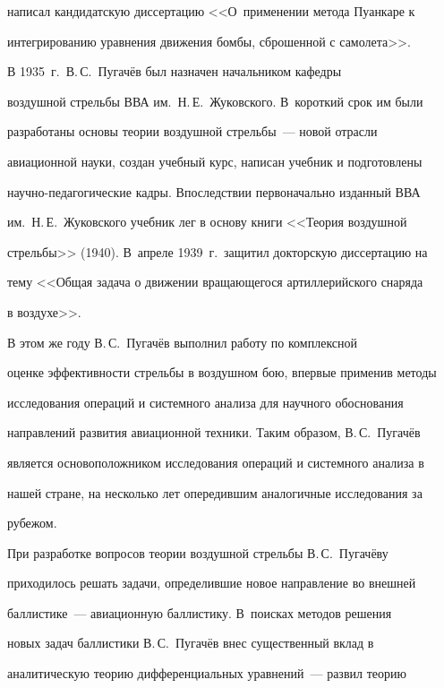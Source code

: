 написал кандидатскую диссертацию <<О~применении метода Пуанкаре к 


интегрированию уравнения движения бомбы, сброшенной с самолета>>.


     


     В 1935~г.\ В.\,С.~Пугачёв был назначен начальником кафедры 


воздушной стрельбы ВВА им.\ Н.\,Е.~Жуковского. В~короткий срок им были 


разработаны основы теории воздушной стрельбы~--- новой отрасли 


авиационной науки, создан учебный курс, написан учебник и подготовлены 


научно-педагогические кадры. Впоследствии первоначально изданный ВВА 


им.\ Н.\,Е.~Жуковского учебник лег в основу книги <<Теория воздушной 


стрельбы>> (1940). В~апреле 1939~г.\ защитил докторскую диссертацию на 


тему <<Общая задача о движении вращающегося артиллерийского снаряда 


в воздухе>>.


     


     В этом же году В.\,С.~Пугачёв выполнил работу по комплексной 


оценке эффективности стрельбы в воздушном бою, впервые применив методы 


исследования операций и системного анализа для научного обоснования 


направлений развития авиационной техники. Таким образом, В.\,С.~Пугачёв 


является основоположником исследования операций и системного анализа в 


нашей стране, на несколько лет опередившим аналогичные исследования за 


рубежом. 


     


     При разработке вопросов теории воздушной стрельбы В.\,С.~Пугачёву 


приходилось решать задачи, определившие новое направление во внешней 


баллистике~--- авиационную баллистику. В~поисках методов решения 


новых задач баллистики В.\,С.~Пугачёв внес существенный вклад в 


аналитическую теорию дифференциальных уравнений~--- развил теорию 


